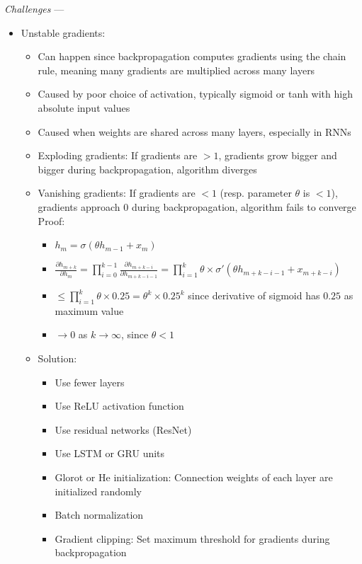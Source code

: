 \emph{Challenges} ---
\begin{itemize}
    \item Unstable gradients:
    \begin{itemize}
        \item Can happen since backpropagation computes gradients using the chain rule, meaning many gradients are multiplied across many layers
        \item Caused by poor choice of activation, typically sigmoid or tanh with high absolute input values
        \item Caused when weights are shared across many layers, especially in RNNs
        \item Exploding gradients: If gradients are $> 1$, gradients grow bigger and bigger during backpropagation, algorithm diverges
        \item Vanishing gradients: If gradients are $< 1$ (resp. parameter $\theta$ is $< 1$), gradients approach $0$ during backpropagation, algorithm fails to converge\\
        Proof:
        \begin{itemize}
            \item $h_m = \sigma(\theta h_{m-1} + x_m)$
            \item $ \frac{\partial h_{m+k}}{\partial h_m}  = \prod_{i=0}^{k-1}  \frac{\partial h_{m+k-i}}{\partial h_{m+k-i-1}} = \prod_{i=1}^{k}  \theta \times \sigma'(\theta h_{m+k-i-1} + x_{m+k-i}) $ 
            \item $\leq \prod_{i=1}^{k}  \theta \times 0.25 = \theta ^k \times 0.25^k$ since derivative of sigmoid has $0.25$ as maximum value
            \item $\to 0$ as $k \to \infty$, since $ \theta  < 1$
        \end{itemize}
        \item Solution:
        \begin{itemize}
            \item Use fewer layers
            \item Use ReLU activation function
            \item Use residual networks (ResNet)
            \item Use LSTM or GRU units
            \item Glorot or He initialization: Connection weights of each layer are initialized randomly
            \item Batch normalization
            \item Gradient clipping: Set maximum threshold for gradients during backpropagation

\end{itemize}
\end{itemize}
\end{itemize}
